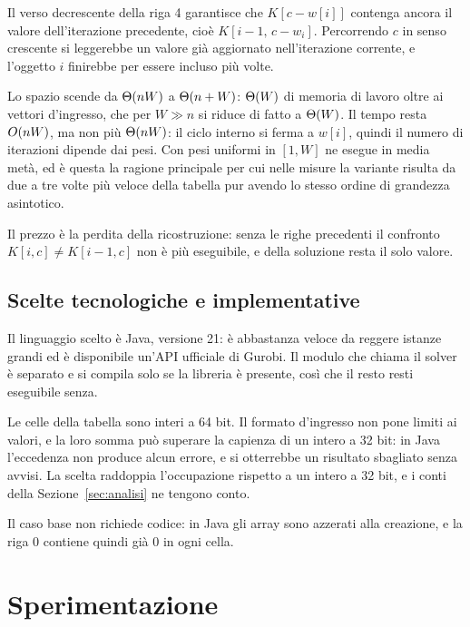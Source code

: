\documentclass[11pt]{article}
\begin{document}
Il verso decrescente della riga 4 garantisce che $K[c-w[i]]$ contenga ancora il
valore dell'iterazione precedente, cio\`e $K[i-1,\,c-w_i]$. Percorrendo $c$ in
senso crescente si leggerebbe un valore gi\`a aggiornato nell'iterazione
corrente, e l'oggetto $i$ finirebbe per essere incluso pi\`u volte.

Lo spazio scende da $\Theta(nW)$ a $\Theta(n+W)$: $\Theta(W)$ di memoria di lavoro oltre
ai vettori d'ingresso, che per $W \gg n$ si riduce di fatto a $\Theta(W)$. Il tempo
resta $O(nW)$, ma non pi\`u $\Theta(nW)$: il ciclo interno si ferma a $w[i]$,
quindi il numero di iterazioni dipende dai pesi. Con pesi uniformi in $[1,W]$ ne
esegue in media met\`a, ed \`e questa la ragione principale per cui nelle misure
la variante risulta da due a tre volte pi\`u veloce della tabella pur avendo lo
stesso ordine di grandezza asintotico.

Il prezzo \`e la perdita della ricostruzione: senza le righe precedenti il
confronto $K[i,c] \neq K[i-1,c]$ non \`e pi\`u eseguibile, e della soluzione
resta il solo valore.

\subsection{Scelte tecnologiche e implementative}
Il linguaggio scelto \`e Java, versione 21: \`e abbastanza veloce da reggere
istanze grandi ed \`e disponibile un'API ufficiale di Gurobi. Il modulo che
chiama il solver \`e separato e si compila solo se la libreria \`e presente,
cos\`i che il resto resti eseguibile senza.

Le celle della tabella sono interi a 64 bit. Il formato d'ingresso non pone
limiti ai valori, e la loro somma pu\`o superare la capienza di un intero a 32
bit: in Java l'eccedenza non produce alcun errore, e si otterrebbe un risultato
sbagliato senza avvisi. La scelta raddoppia l'occupazione rispetto a un intero a
32 bit, e i conti della Sezione~\ref{sec:analisi} ne tengono conto.

Il caso base non richiede codice: in Java gli array sono azzerati alla creazione,
e la riga $0$ contiene quindi gi\`a $0$ in ogni cella.

\section{Sperimentazione}\label{sec:sperimentazione}
\end{document}

